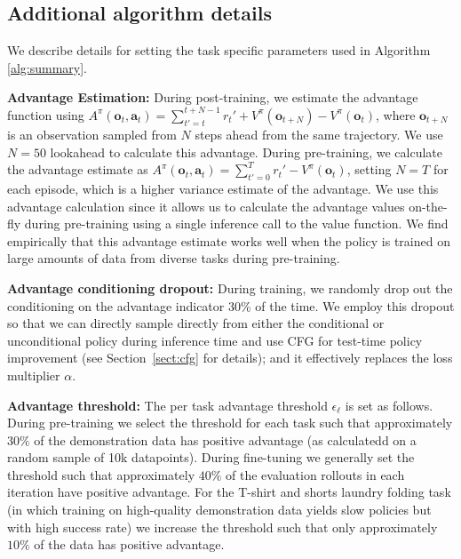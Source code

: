 \documentclass[conference]{IEEEtran}
\newcommand{\ba}{\mathbf{a}}
\newcommand{\bo}{\mathbf{o}}
\newcommand{\lang}{\ell}
\begin{document}
\subsection{Additional algorithm details}
\label{app:alg_details}

We describe details for setting the task specific parameters used in Algorithm \ref{alg:summary}.


\textbf{Advantage Estimation:} During post-training, we estimate the advantage function using $A^\pi(\bo_t,\ba_t) = \sum_{t'=t}^{t+N-1} r_t' + V^\pi(\bo_{t+N}) - V^\pi(\bo_t)$, where $\bo_{t+N}$ is an observation sampled from $N$ steps ahead from the same trajectory. We use $N=50$ lookahead to calculate this advantage. During pre-training, we calculate the advantage estimate as $A^\pi(\bo_t,\ba_t) = \sum_{t'=0}^{T} r_t' - V^\pi(\bo_t)$, setting $N = T$ for each episode, which is a higher variance estimate of the advantage. We use this advantage calculation since it allows us to calculate the advantage values on-the-fly during pre-training using a single inference call to the value function. We find empirically that this advantage estimate works well when the policy is trained on large amounts of data from diverse tasks during pre-training.


\textbf{Advantage conditioning dropout:} During training, we randomly drop out the conditioning on the advantage indicator 30\% of the time. We employ this dropout so that we can directly sample directly from either the conditional or unconditional policy during inference time and use CFG for test-time policy improvement (see Section~\ref{sect:cfg} for details); and it effectively replaces the loss multiplier $\alpha$.

\textbf{Advantage threshold:} The per task advantage threshold $\epsilon_\lang$ is set as follows. During pre-training we select the threshold for each task such that approximately $30 \%$ of the demonstration data has positive advantage (as calculatedd on a random sample of 10k datapoints). During fine-tuning we generally set the threshold such that approximately $40 \%$ of the evaluation rollouts in each iteration have positive advantage. For the T-shirt and shorts laundry folding task (in which training on high-quality demonstration data yields slow policies but with high success rate) we increase the threshold such that only approximately $10 \%$ of the data has positive advantage.
\end{document}
